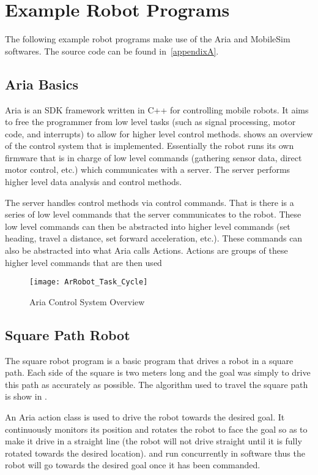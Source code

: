 \documentclass[main.tex]{subfiles}
\begin{document}
\section{Example Robot Programs}
The following example robot programs make use of the Aria and MobileSim
softwares. The source code can be found in~\ref{appendixA}.

\subsection{Aria Basics}

Aria is an SDK framework written in C++ for controlling mobile robots. It aims
to free the programmer from low level tasks (such as signal processing, motor
code, and interrupts) to allow for higher level control methods.
 shows an overview of the control system that is implemented.
Essentially the robot runs its own firmware that is in charge of low level
commands (gathering sensor data, direct motor control, etc.) which communicates
with a server. The server performs higher level data analysis and control
methods. 

The server handles control methods via control commands. That is there is a
series of low level commands that the server communicates to the robot. These
low level commands can then be abstracted into higher level commands (set
heading, travel a distance, set forward acceleration, etc.). These commands can
also be abstracted into what Aria calls Actions. Actions are groups of these
higher level commands that are then used

\begin{figure}[H]
\begin{center}
\texttt{[image: ArRobot\_Task\_Cycle]}
\end{center}
\caption{Aria Control System Overview}
\label{fig:ariaCtrl}
\end{figure}

\subsection{Square Path Robot}
The square robot program is a basic program that drives a robot in a square
path. Each side of the square is two meters long and the goal was simply to
drive this path as accurately as possible. The algorithm used to travel the
square path is show in . 

An Aria action class is used to drive the robot towards the desired goal. It
continuously monitors its position and rotates the robot to face the goal so as
to make it drive in a straight line (the robot will not drive straight until it
is fully rotated towards the desired location).  and
 run concurrently in software thus the robot will go
towards the desired goal once it has been commanded.
\end{document}
